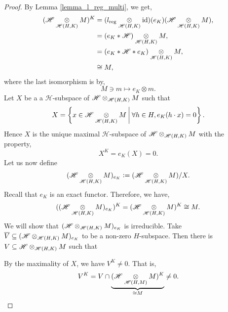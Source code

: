 \documentclass[8pt]{article}
\DeclareMathOperator{\id}{id}
\DeclareMathOperator{\reg}{reg}
\newcommand{\defeq}{\vcentcolon=}
\newcommand{\hecke}[0]{\mathscr{H}}
\newcommand{\tens}[1]{%
  \mathbin{\mathop{\otimes}\displaylimits_{#1}}%
}
\begin{document}
\begin{proof}
By Lemma \ref{lemma_l_reg_multi}, we get,
  \begin{align*}
    (\hecke\tens{\hecke(H,K)}M)^K & = (l_{\reg}\tens{\hecke(H,K)}\id)(e_K)(\hecke\tens{\hecke(H,K)}M),\\
    & = (e_K\ast \hecke )\tens{\hecke(H,K)}M,\\
    & = (e_K\ast \hecke \ast e_K)\tens{\hecke(H,K)}M,\\
    & \cong M,
  \end{align*}
  where the last isomorphism is by,
  \begin{equation*}
    M\ni m\mapsto e_K\otimes m.
  \end{equation*}
  Let $X$ be a a $\hecke$-subspace of $\hecke\tens{\hecke(H,K)} M$ such that 
  \begin{equation*}
    X = \left\{x\in\hecke\tens{\hecke(H,K)} M\:\bigg{|}\: \forall h\in H, e_K(h\cdot x) = 0\right\}.
  \end{equation*}
  Hence $X$ is the unique maximal $\hecke$-subspace of $\hecke\tens{\hecke(H,K)} M$ with the property,
  \begin{equation*}
    X^K = e_K(X) = 0.
  \end{equation*}
  Let us now define 
  \begin{equation*}
    (\hecke\tens{\hecke(H,K)} M)_{e_K}\defeq (\hecke\tens{\hecke(H,K)} M)/X.
  \end{equation*}
  Recall that $e_K$ is an exact functor. Therefore, we have,
  \begin{equation*}
  ((\hecke\tens{\hecke(H,K)}M)_{e_K})^K = (\hecke\tens{\hecke(H,K)}M)^K \cong M.
  \end{equation*}
  We will show that $(\hecke\tens{\hecke(H,K)}M)_{e_K}$ is irreducible. Take $\overline{V}\subseteq (\hecke\tens{\hecke(H,K)}M)_{e_K}$ to be 
  a non-zero $H$-subspace. Then there is $V\subseteq \hecke\tens{\hecke(H,K)}M$ such that 
  \begin{center}
  \end{center}
  By the maximality of $X$, we have $V^K\not=0$. That is,
  \begin{equation*}
    V^K = V\cap \underbrace{(\hecke\tens{\hecke(H,M)}M)^K}_{\cong M} \not = 0.

\end{equation*}
\end{proof}
\end{document}
